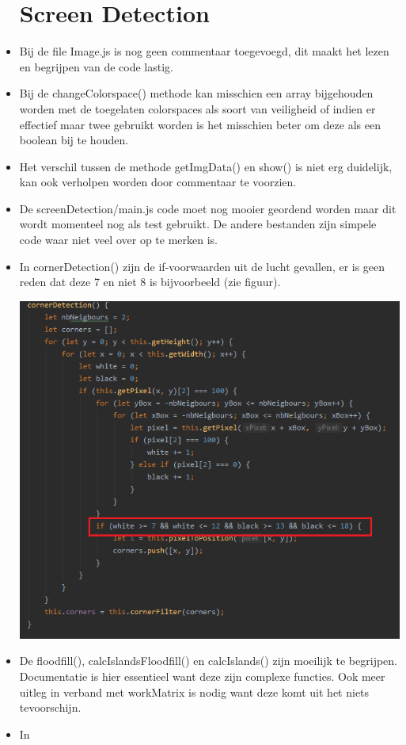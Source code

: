 \documentclass[a4paper,11pt]{article}
\begin{document}
\begin{itemize}

\section{Screen Detection}

\item Bij de file Image.js is nog geen commentaar toegevoegd, dit maakt het lezen en begrijpen van de code lastig.
\item Bij de changeColorspace() methode kan misschien een array bijgehouden worden met de toegelaten colorspaces als soort van veiligheid of indien er effectief maar twee gebruikt worden is het misschien beter om deze als een boolean bij te houden. 
\item Het verschil tussen de methode getImgData() en show() is niet erg duidelijk, kan ook verholpen worden door commentaar te voorzien.
\item De screenDetection/main.js code moet nog mooier geordend worden maar dit wordt momenteel nog als test gebruikt. De andere bestanden zijn simpele code waar niet veel over op te merken is.
\item In cornerDetection() zijn de if-voorwaarden uit de lucht gevallen, er is geen reden dat deze 7 en niet 8 is bijvoorbeeld (zie figuur).

\includegraphics[scale=0.75]{code1}
\item De floodfill(), calcIslandsFloodfill() en calcIslands() zijn moeilijk te begrijpen. Documentatie is hier essentieel want deze zijn complexe functies. Ook meer uitleg in verband met workMatrix is nodig want deze komt uit het niets tevoorschijn.
\item In 


\end{itemize}
\end{document}
